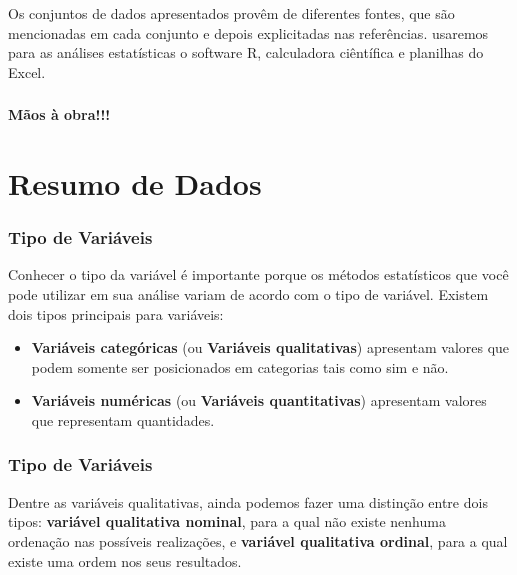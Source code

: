 \documentclass[14pt,aspectratio=1610]{beamer}
\begin{document}
\begin{frame}{}
\frametitle{}
\begin{block}{}
\justifying
Os conjuntos de dados apresentados provêm de diferentes fontes, que são mencionadas
em cada conjunto e depois explicitadas nas referências. usaremos para as análises estatísticas o software R, calculadora ciêntífica e planilhas do Excel. 
\end{block}
\end{frame}

\begin{frame}{}
\frametitle{}
\begin{block}{}
\centering
{\Large \bf{Mãos à obra!!!}}
\end{block}
\end{frame}

\section{Resumo de Dados}
\begin{frame}{}
\frametitle{Tipo de Variáveis}
\begin{block}{}
\justifying
Conhecer o tipo da variável é importante porque os métodos estatísticos que você pode utilizar em sua análise variam de acordo com o tipo de variável. Existem dois 
tipos principais para variáveis:
\begin{itemize}
\item {\bf Variáveis categóricas} (ou {\bf Variáveis qualitativas}) apresentam valores que podem somente ser posicionados em categorias tais como sim e não. \pause
\item {\bf Variáveis numéricas} (ou {\bf Variáveis quantitativas}) apresentam valores que representam quantidades.
\end{itemize}
\end{block}
\end{frame}

\begin{frame}{}
\frametitle{Tipo de Variáveis}
\begin{block}{}
\justifying
Dentre as variáveis qualitativas, ainda podemos fazer uma distinção entre dois tipos: \textbf{variável qualitativa nominal}, para a qual não existe nenhuma ordenação nas
possíveis realizações, e \textbf{variável qualitativa ordinal}, para a qual existe uma ordem nos seus resultados.
\end{block}
\end{frame}
\end{document}
